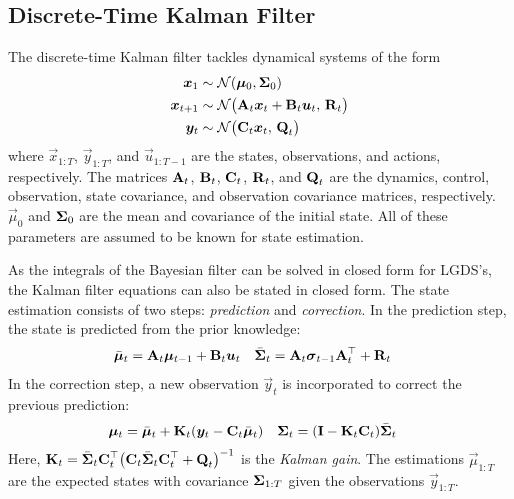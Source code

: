 		\subsection{Discrete-Time Kalman Filter}
			The discrete-time Kalman filter tackles dynamical systems of the form
			\begin{align}
				\bm{x}_1 &\sim \mathcal{N}(\bm{\mu}_0, \bm{\mathrm{\Sigma}}_0) \\
				\bm{x}_{t + 1} &\sim \mathcal{N}\bigl( \bm{\mathrm{A}}_t \bm{x}_t + \bm{\mathrm{B}}_t \bm{u}_t,\, \bm{\mathrm{R}}_t \bigr) \\
				\bm{y}_t &\sim \mathcal{N}\bigl( \bm{\mathrm{C}}_t \bm{x}_t,\, \bm{\mathrm{Q}}_t \bigr)
			\end{align}
			where \(\vec{x}_{1:T}\), \(\vec{y}_{1:T}\), and \(\vec{u}_{1:T - 1}\) are the states, observations, and actions, respectively. The matrices \(\bm{\mathrm{A}}_t\), \(\bm{\mathrm{B}}_t\), \(\bm{\mathrm{C}}_t\), \(\bm{\mathrm{R}}_t\), and \(\bm{\mathrm{Q}}_t\) are the dynamics, control, observation, state covariance, and observation covariance matrices, respectively. \(\vec{\mu}_0\) and \(\bm{\mathrm{\Sigma}}_0\) are the mean and covariance of the initial state. All of these parameters are assumed to be known for state estimation.

			As the integrals of the Bayesian filter can be solved in closed form for LGDS's, the Kalman filter equations can also be stated in closed form. The state estimation consists of two steps: \emph{prediction} and \emph{correction}. In the prediction step, the state is predicted from the prior knowledge:
			\begin{align}
				\bar{\bm{\mu}}_t &= \bm{\mathrm{A}}_t \bm{\mu}_{t - 1} + \bm{\mathrm{B}}_t \bm{u}_t &
				\bar{\bm{\mathrm{\Sigma}}}_t &=\bm{\mathrm{A}}_t \bm{\mathrm{\sigma}}_{t - 1} \bm{\mathrm{A}}_t^\top + \bm{\mathrm{R}}_t
			\end{align}
			In the correction step, a new observation \(\vec{y}_t\) is incorporated to correct the previous prediction:
			\begin{align}
				\bm{\mu}_t &= \bar{\bm{\mu}}_t + \bm{\mathrm{K}}_t (\bm{y}_t - \bm{\mathrm{C}}_t \bar{\bm{\mu}}_t) &
				\bm{\mathrm{\Sigma}}_t &= (\bm{\mathrm{I}} - \bm{\mathrm{K}}_t \bm{\mathrm{C}}_t) \bar{\bm{\mathrm{\Sigma}}}_t
			\end{align}
			Here, \( \bm{\mathrm{K}}_t = \bar{\bm{\mathrm{\Sigma}}}_t \bm{\mathrm{C}}_t^\top \bigl( \bm{\mathrm{C}}_t \bar{\bm{\mathrm{\Sigma}}}_t \bm{\mathrm{C}}_t^\top + \bm{\mathrm{Q}}_t \bigr)^{-1} \) is the \emph{Kalman gain}. The estimations \( \vec{\mu}_{1:T} \) are the expected states with covariance \( \bm{\mathrm{\Sigma}}_{1:T} \) given the observations \( \vec{y}_{1:T} \).

